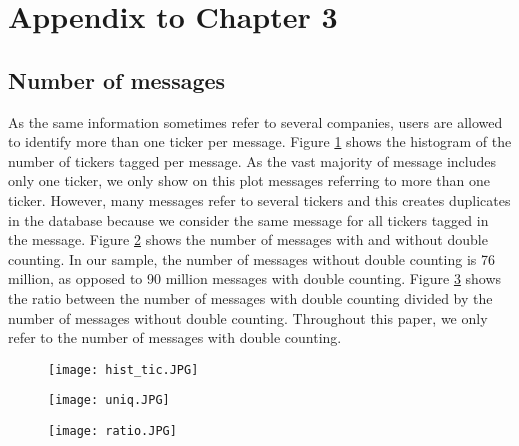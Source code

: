 


\newpage 

\section{Appendix to Chapter 3}
\subsection{Number of messages}
As the same information sometimes refer to several companies, users are allowed to identify more than one ticker per message.  Figure \ref{fig:histtic} shows the histogram of the number of tickers tagged per message. As the vast majority of message includes only one ticker, we only show on this plot messages referring to more than one ticker. However, many messages refer to several tickers and this creates duplicates in the database because we consider the same message for all tickers tagged in the message. Figure \ref{fig:uniq} shows the number of messages with and without double counting. In our sample, the number of messages without double counting is 76 million, as opposed to 90 million messages with double counting. Figure \ref{fig:ratio} shows the ratio between the number of messages with double counting divided by the number of messages without double counting. Throughout this paper, we only refer to the number of messages with double counting.


\begin{figure}
    \centering
    \texttt{[image: hist\_tic.JPG]}
    \label{fig:histtic}
\end{figure}

\begin{figure}
    \centering
    \texttt{[image: uniq.JPG]}
    \label{fig:uniq}
\end{figure}

\begin{figure}
    \centering
    \texttt{[image: ratio.JPG]}
    \label{fig:ratio}
\end{figure}

